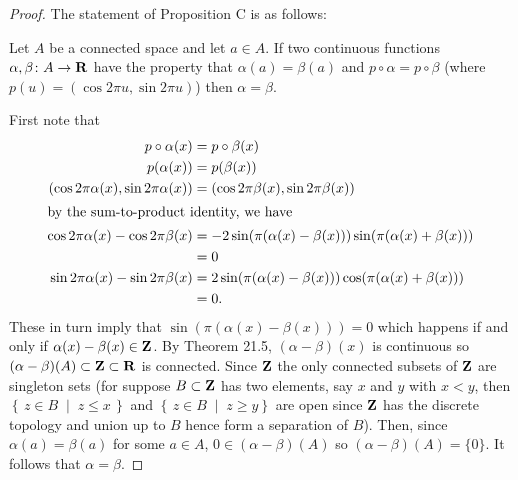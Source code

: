 \begin{proof}
The statement of Proposition C is as follows:
\begin{proposition*}[\textbf{C}]
Let $A$ be a connected space and let $a\in A$. If two continuous functions
$\alpha,\beta\colon A\to\mathbf{R}$ have the property that $\alpha(a)=\beta(a)$
and $p\circ\alpha=p\circ\beta$ (where $p(u)=(\cos 2\pi u,\sin 2\pi u)$)
then $\alpha=\beta$.
\end{proposition*}
First note that
\begin{align*}
p\circ\alpha(x)&=p\circ\beta(x)\\
p(\alpha(x))&=p(\beta(x))\\
(\cos 2\pi\alpha(x),\sin 2\pi\alpha(x))&=(\cos 2\pi\beta(x),\sin
                                         2\pi\beta(x))\\
\intertext{by the sum-to-product identity, we have}
\cos 2\pi\alpha(x)-\cos 2\pi\beta(x)
&=-2\sin(\pi(\alpha(x)-\beta(x)))\sin(\pi(\alpha(x)+\beta(x)))\\
&=0\\
\sin 2\pi\alpha(x)-\sin 2\pi\beta(x)
&=2\sin(\pi(\alpha(x)-\beta(x)))\cos(\pi(\alpha(x)+\beta(x)))\\
&=0.
\end{align*}
These in turn imply that $\sin(\pi(\alpha(x)-\beta(x)))=0$ which happens if
and only if $\alpha(x)-\beta(x)\in\mathbf{Z}$. By Theorem 21.5,
$(\alpha-\beta)(x)$ is continuous so
$(\alpha-\beta)(A)\subset\mathbf{Z}\subset\mathbf{R}$ is connected. Since $\mathbf{Z}$ the only
connected subsets of $\mathbf{Z}$ are singleton sets (for suppose $B\subset\mathbf{Z}$
has two elements, say $x$ and $y$ with $x<y$, then $\left\{\,z\in
  B\;\middle|\;z\leq x\,\right\}$ and $\left\{\,z\in B\;\middle|\;z\geq
  y\right\}$ are open since $\mathbf{Z}$ has the discrete topology and union up to
$B$ hence form a separation of $B$). Then, since $\alpha(a)=\beta(a)$ for
some $a\in A$, $0\in(\alpha-\beta)(A)$ so $(\alpha-\beta)(A)=\{0\}$. It
follows that $\alpha=\beta$.
\end{proof}


